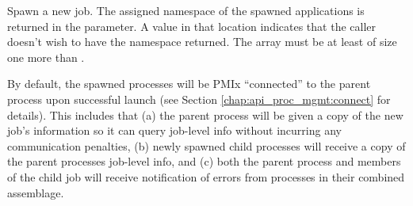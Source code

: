 
\optattrend

\descr

Spawn a new job.
The assigned namespace of the spawned applications is returned in the  parameter.
A  value in that location indicates that the caller doesn't wish to have the namespace returned.
The  array must be at least of size one more than .

By default, the spawned processes will be PMIx ``connected'' to the parent process upon successful launch (see Section \ref{chap:api_proc_mgmt:connect}
for details). This includes that (a) the parent process will be given a copy of the new job's
information so it can query job-level info without incurring any communication penalties, (b) newly spawned child processes will receive a copy of the parent processes job-level info, and (c) both the parent process and members of the child job will receive notification of errors from processes in their combined assemblage.

